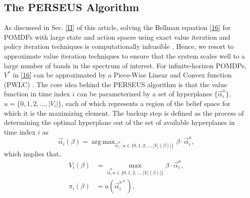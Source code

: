 \documentclass[10pt,twocolumn]{IEEEtran}
\DeclareMathOperator*{\argmax}{arg\,max}
\begin{document}
\subsection{The PERSEUS Algorithm}
As discussed in Sec. \ref{II} of this article, solving the Bellman equation \eqref{16} for POMDPs with large state and action spaces using exact value iteration and policy iteration techniques \cite{Kaelbling:1998:PAP:1643275.1643301} is computationally infeasible \cite{DBLP:journals/corr/abs-1109-2145, Pineau:2003:PVI:1630659.1630806}. Hence, we resort to approximate value iteration techniques to ensure that the system scales well to a large number of bands in the spectrum of interest. For infinite-horizon POMDPs, $V^*$ in \eqref{16} can be approximated by a Piece-Wise Linear and Convex function (PWLC) \cite{Kaelbling:1998:PAP:1643275.1643301}. The core idea behind the PERSEUS algorithm is that the value function in time index $i$ can be parameterized by a set of hyperplanes $\{\vec{\alpha}_i^{u}\}$, $u = \{0,1,2,\dots,|V_i|\}$, each of which represents a region of the belief space for which it is the maximizing element. The backup step is defined as the process of determining the optimal hyperplane out of the set of available hyperplanes in time index $i$ as
\begin{equation}\label{39}
    \vec{\alpha}_{i}(\beta) = \argmax_{\vec{\alpha}_{i}^u, u \in \{0, 1, 2, \dots, |V_i(\beta)|\}} \beta \cdot \vec{\alpha}_{i}^u,
\end{equation}
which implies that,
\begin{equation}\label{40}
    \begin{split}
        V_i(\beta) &= \max_{\vec{\alpha}_{i}^u u \in \{0, 1, 2, \dots, |V_i(\beta)|\}} \beta \cdot \vec{\alpha}_{i}^u,\\
        \pi_i(\beta) &= a(\vec{\alpha}_i^{u*}),
    \end{split}
\end{equation}
\end{document}

